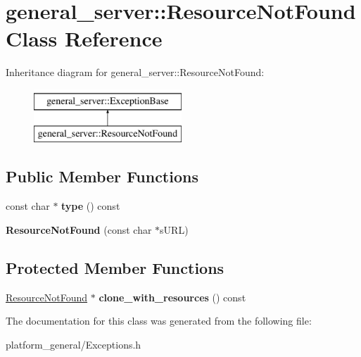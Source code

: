 \hypertarget{classgeneral__server_1_1ResourceNotFound}{\section{general\-\_\-server\-:\-:\-Resource\-Not\-Found \-Class \-Reference}
\label{classgeneral__server_1_1ResourceNotFound}
}
\-Inheritance diagram for general\-\_\-server\-:\-:\-Resource\-Not\-Found\-:\begin{figure}[H]
\begin{center}
\leavevmode
\includegraphics[height=2.000000cm]{classgeneral__server_1_1ResourceNotFound}
\end{center}
\end{figure}
\subsection*{\-Public \-Member \-Functions}
\begin{DoxyCompactItemize}
\item 
\hypertarget{classgeneral__server_1_1ResourceNotFound_ac9337b146ae8112dfb67512d7548c9cf}{const char $\ast$ {\bfseries type} () const }\label{classgeneral__server_1_1ResourceNotFound_ac9337b146ae8112dfb67512d7548c9cf}

\item 
\hypertarget{classgeneral__server_1_1ResourceNotFound_a395dc522e4db5771e4d9d5271d399bcc}{{\bfseries \-Resource\-Not\-Found} (const char $\ast$s\-U\-R\-L)}\label{classgeneral__server_1_1ResourceNotFound_a395dc522e4db5771e4d9d5271d399bcc}

\end{DoxyCompactItemize}
\subsection*{\-Protected \-Member \-Functions}
\begin{DoxyCompactItemize}
\item 
\hypertarget{classgeneral__server_1_1ResourceNotFound_adf263bafc2c981a6283b46a00e573b7a}{\hyperlink{classgeneral__server_1_1ResourceNotFound}{\-Resource\-Not\-Found} $\ast$ {\bfseries clone\-\_\-with\-\_\-resources} () const }\label{classgeneral__server_1_1ResourceNotFound_adf263bafc2c981a6283b46a00e573b7a}

\end{DoxyCompactItemize}


\-The documentation for this class was generated from the following file\-:\begin{DoxyCompactItemize}
\item 
platform\-\_\-general/\-Exceptions.\-h\end{DoxyCompactItemize}
